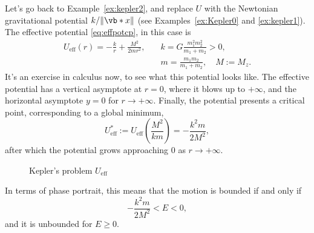 \documentclass[english,fontsize=11pt,paper=b5]{scrbook}
\theoremstyle{definition}
\begin{document}
    Let's go back to Example~\ref{ex:kepler2}, and replace $U$ with the Newtonian gravitational potential $k/\|\vb*{x}\|$ (see Examples~\ref{ex:Kepler0} and \ref{ex:kepler1}).
    The effective potential \eqref{eq:effpotcp}, in this case is
    \begin{align}
      U_{\mathrm{eff}} (r) = -\frac kr + \frac {M^2}{2 m r^2}, \quad & k = G \frac{m_1^2 m_2^2}{m_1+m_2} > 0,      \\
                                                                     & m = \frac{m_1m_2}{m_1+m_2}, \quad M := M_z.
    \end{align}
    It's an exercise in calculus now, to see what this potential looks like.
    The effective potential has a vertical asymptote at $r=0$, where it blows up to $+\infty$,
    and the horizontal asymptote $y=0$ for $r\to+\infty$.
    Finally, the potential presents a critical point, corresponding to a global minimum,
    \begin{equation}
      U_{\mathrm{eff}}^* := U_{\mathrm{eff}}\left(\frac{M^2}{k m}\right) = - \frac{k^2m}{2M^2},
    \end{equation}
    after which the potential grows approaching $0$ as $r\to+\infty$.

    \begin{figure}[th]
      \centering
      \label{fig:KeplerVeff}
      \caption{Kepler's problem $U_{\mathrm{eff}}$}
    \end{figure}
    In terms of phase portrait, this means that the motion is bounded if and only if
    \begin{equation}
      - \frac{k^2 m}{2 M^2} < E < 0,
    \end{equation}
    and it is unbounded for $E \geq 0$.
\end{document}
